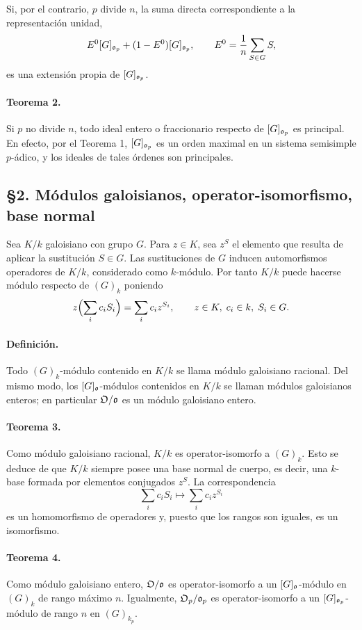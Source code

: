 Si, por el contrario, \(p\) divide \(n\), la suma directa correspondiente a la representación unidad,
\[
        E^0 [G]_{\mathfrak o_p}+(1-E^0)[G]_{\mathfrak o_p},
        \qquad
        E^0=\frac1n\sum_{S\in G}S,
\]
es una extensión propia de \([G]_{\mathfrak o_p}\).

\paragraph{Teorema 2.}
Si \(p\) no divide \(n\), todo ideal entero o fraccionario respecto de \([G]_{\mathfrak o_p}\) es principal. En efecto, por el Teorema 1, \([G]_{\mathfrak o_p}\) es un orden maximal en un sistema semisimple \(p\)-ádico, y los ideales de tales órdenes son principales.

\subsection*{§2. Módulos galoisianos, operator-isomorfismo, base normal}

Sea \(K/k\) galoisiano con grupo \(G\). Para \(z\in K\), sea \(z^S\) el elemento que resulta de aplicar la sustitución \(S\in G\). Las sustituciones de \(G\) inducen automorfismos operadores de \(K/k\), considerado como \(k\)-módulo. Por tanto \(K/k\) puede hacerse módulo respecto de \((G)_k\) poniendo
\[
        z\Bigl(\sum_i c_iS_i\Bigr)=\sum_i c_i z^{S_i},
        \qquad z\in K,\; c_i\in k,\; S_i\in G.
\]

\paragraph{Definición.}
Todo \((G)_k\)-módulo contenido en \(K/k\) se llama módulo galoisiano racional. Del mismo modo, los \([G]_{\mathfrak o}\)-módulos contenidos en \(K/k\) se llaman módulos galoisianos enteros; en particular \(\mathfrak O/\mathfrak o\) es un módulo galoisiano entero.

\paragraph{Teorema 3.}
Como módulo galoisiano racional, \(K/k\) es operator-isomorfo a \((G)_k\). Esto se deduce de que \(K/k\) siempre posee una base normal de cuerpo, es decir, una \(k\)-base formada por elementos conjugados \(z^S\). La correspondencia
\[
        \sum_i c_iS_i\longmapsto \sum_i c_i z^{S_i}
\]
es un homomorfismo de operadores y, puesto que los rangos son iguales, es un isomorfismo.

\paragraph{Teorema 4.}
Como módulo galoisiano entero, \(\mathfrak O/\mathfrak o\) es operator-isomorfo a un \([G]_{\mathfrak o}\)-módulo en \((G)_k\) de rango máximo \(n\). Igualmente, \(\mathfrak O_p/\mathfrak o_p\) es operator-isomorfo a un \([G]_{\mathfrak o_p}\)-módulo de rango \(n\) en \((G)_{k_p}\).

